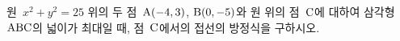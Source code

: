 원~$x^2+y^2=25$ 위의 두 점~$\mathrm{A}(-4{,}\mkern3mu\mathopen{}3)$, $\mathrm{B}(0{,}\mkern3mu\mathopen{}-5)$와 원 위의 점~$\mathrm{C}$에 대하여 삼각형~$\mathrm{ABC}$의 넓이가 최대일 때, 점~$\mathrm{C}$에서의 접선의 방정식을 구하시오.
